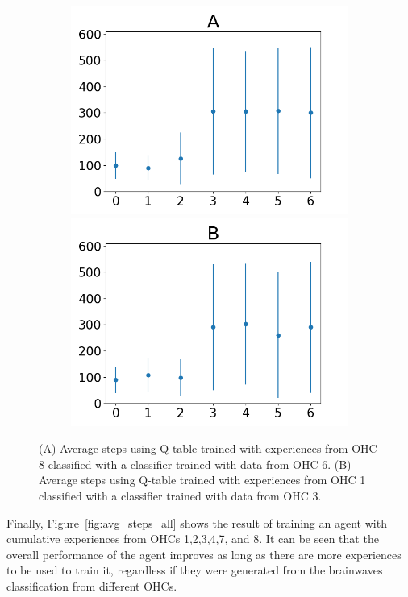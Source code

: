 \documentclass[journal]{IEEEtran}
\begin{document}
{{\begin{figure}[h!]
\begin{subfigure}{0.5\textwidth}
\includegraphics[scale=0.27]{Images/Average_steps/Ax.png}
\includegraphics[scale=0.27]{Images/Average_steps/Bx.png}
\end{subfigure}
\caption{(A) Average steps using Q-table trained with experiences from OHC 8 classified with a classifier trained with data from OHC 6.  (B) Average steps using Q-table trained with experiences from OHC 1 classified with a classifier trained with data from OHC 3.}
\label{fig:transferlearning}
\end{figure}

Finally, Figure~\ref{fig:avg_steps_all} shows the result of training an agent with cumulative experiences from OHCs 1,2,3,4,7, and 8.  It can be seen that the overall performance of the agent improves as long as there are more experiences to be used to train it, regardless if they were generated from the brainwaves classification from different OHCs.  


}}
\end{document}
